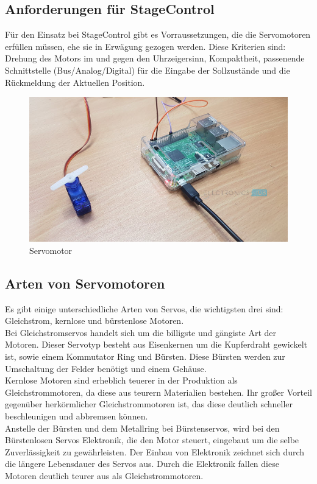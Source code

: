 \subsection{Anforderungen für StageControl}
Für den Einsatz bei StageControl gibt es Vorraussetzungen, die die Servomotoren erfüllen müssen, ehe sie in Erwägung gezogen werden. Diese Kriterien sind: Drehung des Motors im und gegen den Uhrzeigersinn, Kompaktheit, passenende Schnittstelle (Bus/Analog/Digital) für die Eingabe der Sollzustände und die Rückmeldung der Aktuellen Position.

\begin{figure}[H]
	\centering
	\includegraphics[width=0.7\linewidth]{images/servo.jpg}
	\caption[Servomotor]{Servomotor}
	\label{fig:Servo}
\end{figure}

\subsection{Arten von Servomotoren}
Es gibt einige unterschiedliche Arten von Servos, die wichtigsten drei sind: Gleichstrom, kernlose und bürstenlose Motoren. \\
Bei Gleichstromservos handelt sich um die billigste und gängiste Art der Motoren. Dieser Servotyp besteht aus Eisenkernen um die Kupferdraht gewickelt ist, sowie einem Kommutator Ring und Bürsten. Diese Bürsten werden zur Umschaltung der Felder benötigt und einem Gehäuse. \\
Kernlose Motoren sind erheblich teuerer in der Produktion als Gleichstrommotoren, da diese aus teurern Materialien bestehen. Ihr großer Vorteil gegenüber herkörmlicher Gleichstrommotoren ist, das diese deutlich schneller beschleunigen und abbremsen können. \\
Anstelle der Bürsten und dem Metallring bei Bürstenservos, wird bei den Bürstenlosen Servos Elektronik, die den Motor steuert, eingebaut um die selbe Zuverlässigkeit zu gewährleisten. Der Einbau von Elektronik zeichnet sich durch die längere Lebensdauer des Servos aus. Durch die Elektronik fallen diese Motoren deutlich teurer aus als Gleichstrommotoren. \\
\textcite{ServomotorArten}


